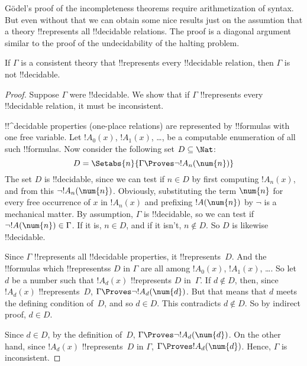 \documentclass[../../../include/open-logic-section]{subfiles}
\begin{document}


G\"odel's proof of the incompleteness theorems require arithmetization
of syntax. But even without that we can obtain some nice results just
on the assumtion that a theory !!{represents} all !!{decidable}
relations.  The proof is a diagonal argument similar to the proof of
the undecidability of the halting problem.

\begin{thm}
If $\Gamma$ is a consistent theory that !!{represents} every
!!{decidable} relation, then $\Gamma$ is not !!{decidable}.
\end{thm}

\begin{proof}
Suppose $\Gamma$ were !!{decidable}. We show that if $\Gamma$
!!{represents} every !!{decidable} relation, it must be inconsistent.

!!^{decidable} properties (one-place relations) are represented by
!!{formula}s with one free variable. Let $!A_0(x)$, $!A_1(x)$, \dots,
be a computable enumeration of all such !!{formula}s.  Now consider
the following set $D \subseteq \Nat$:
\[
D = \Setabs{n}{\Gamma \Proves \lnot !A_n(\num{n})}
\]
The set $D$ is !!{decidable}, since we can test if $n \in D$ by first
computing $!A_n(x)$, and from this $\lnot !A_n(\num{n})$. Obviously,
substituting the term $\num{n}$ for every free occurrence of $x$ in
$!A_n(x)$ and prefixing $!A(\num{n})$ by $\lnot$ is a mechanical
matter.  By assumption, $\Gamma$ is !!{decidable}, so we can test if
$\lnot !A(\num{n}) \in \Gamma$. If it is, $n \in D$, and if it isn't,
$n \notin D$. So $D$ is likewise !!{decidable}.

Since $\Gamma$ !!{represents} all !!{decidable} properties, it
!!{represents}~$D$.  And the !!{formula}s which !!{represents}s $D$ in
$\Gamma$ are all among $!A_0(x)$, $!A_1(x)$, \dots. So let $d$ be a
number such that $!A_d(x)$ !!{represents} $D$ in~$\Gamma$.  If $d
\notin D$, then, since $!A_d(x)$ !!{represents}~$D$, $\Gamma \Proves
\lnot !A_d(\num{d})$. But that means that $d$ meets the defining
condition of~$D$, and so $d \in D$. This contradicts $d \notin D$. So
by indirect proof, $d \in D$.

Since $d \in D$, by the definition of~$D$, $\Gamma \Proves \lnot
!A_d(\num{d})$. On the other hand, since $!A_d(x)$ !!{represents}~$D$
in $\Gamma$, $\Gamma \Proves !A_d(\num{d})$. Hence, $\Gamma$ is
inconsistent.
\end{proof}
\end{document}
